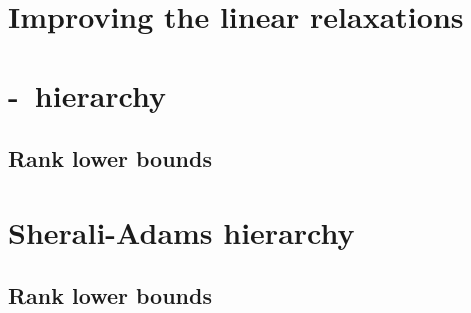 \documentclass[a4paper,twoside,justified]{tufte-handout}
\begin{document}
\section{Improving the linear relaxations}


\section{\Lovasz-\Schrijver\ hierarchy}

\subsection{Rank lower bounds}

\section{Sherali-Adams hierarchy}

\subsection{Rank lower bounds}




\end{document}
